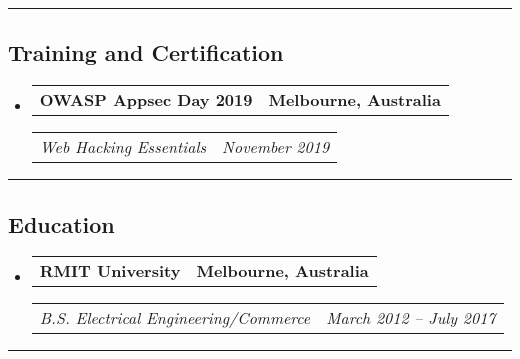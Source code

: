 \documentclass[11pt,letterpaper]{article}
\makeatletter
\newcommand{\headerrow}[2]
{\begin{tabular*}{\linewidth}{l@{\extracolsep{\fill}}r}
#1 &
#2 \\
\end{tabular*}}
\makeatother
\begin{document}
\hrule
\vspace{-1em}
\subsection*{\Large Training and Certification}

\begin{itemize}[leftmargin=1em]
	\parskip=0.1em
		
	\item
	      \headerrow
	      {\textbf{OWASP Appsec Day 2019}}
	      {\textbf{Melbourne, Australia}}
	      \headerrow
	      {\emph{Web Hacking Essentials}}
	      {\emph{November 2019}}
	      	      
\end{itemize}

\hrule
\vspace{-1em}
\subsection*{\Large Education}

\begin{itemize}[leftmargin=1em]
	\parskip=0.1em
		
	\item
	      \headerrow
	      {\textbf{RMIT University}}
	      {\textbf{Melbourne, Australia}}
	      \headerrow
	      {\emph{B.S. Electrical Engineering/Commerce}}
	      {\emph{March 2012 -- July 2017}}
	      	      
\end{itemize}

\hrule
\vspace{-1em}
\end{document}
